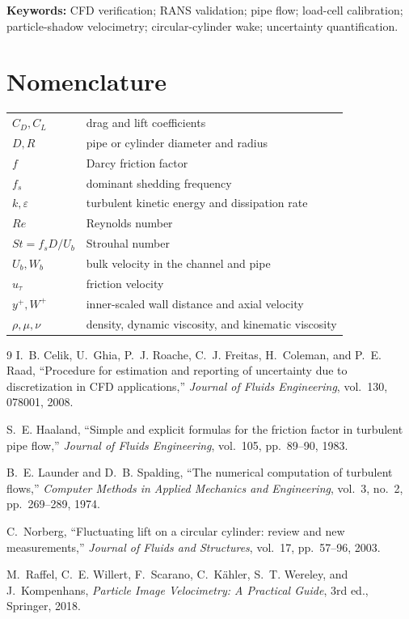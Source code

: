 \documentclass[11pt,a4paper]{article}
\begin{document}
\textbf{Keywords:} CFD verification; RANS validation; pipe flow; load-cell calibration; particle-shadow velocimetry; circular-cylinder wake; uncertainty quantification.

\tableofcontents
\clearpage

\section*{Nomenclature}
\begin{tabularx}{\linewidth}{@{}lX@{}}
$C_D,C_L$ & drag and lift coefficients \\
$D,R$ & pipe or cylinder diameter and radius \\
$f$ & Darcy friction factor \\
$f_s$ & dominant shedding frequency \\
$k,\varepsilon$ & turbulent kinetic energy and dissipation rate \\
$Re$ & Reynolds number \\
$St=f_sD/U_b$ & Strouhal number \\
$U_b,W_b$ & bulk velocity in the channel and pipe \\
$u_\tau$ & friction velocity \\
$y^+,W^+$ & inner-scaled wall distance and axial velocity \\
$\rho,\mu,\nu$ & density, dynamic viscosity, and kinematic viscosity
\end{tabularx}

\clearpage
{}











\begin{thebibliography}{9}
I.~B. Celik, U.~Ghia, P.~J. Roache, C.~J. Freitas, H.~Coleman, and P.~E. Raad,
``Procedure for estimation and reporting of uncertainty due to discretization in CFD applications,''
\emph{Journal of Fluids Engineering}, vol.~130, 078001, 2008.

S.~E. Haaland,
``Simple and explicit formulas for the friction factor in turbulent pipe flow,''
\emph{Journal of Fluids Engineering}, vol.~105, pp.~89--90, 1983.

B.~E. Launder and D.~B. Spalding,
``The numerical computation of turbulent flows,''
\emph{Computer Methods in Applied Mechanics and Engineering}, vol.~3, no.~2, pp.~269--289, 1974.

C.~Norberg,
``Fluctuating lift on a circular cylinder: review and new measurements,''
\emph{Journal of Fluids and Structures}, vol.~17, pp.~57--96, 2003.

M.~Raffel, C.~E. Willert, F.~Scarano, C.~K\"ahler, S.~T. Wereley, and J.~Kompenhans,
\emph{Particle Image Velocimetry: A Practical Guide}, 3rd ed., Springer, 2018.
\end{thebibliography}
\end{document}
